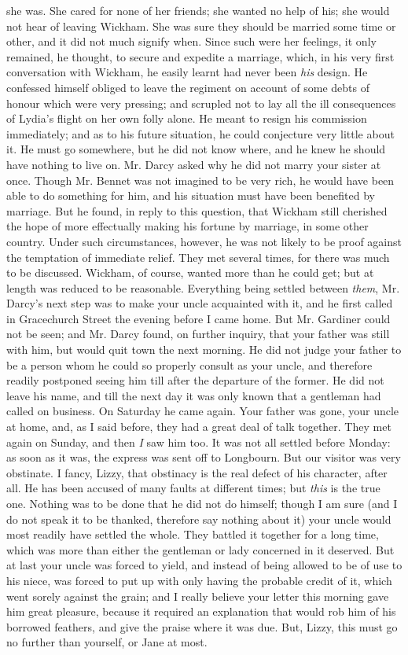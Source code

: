 \documentclass[12pt,openright]{book}
\begin{document}
she was. She cared for none of her friends; she wanted no help of his; she would not hear of leaving Wickham. She was sure they should be married some time or other, and it did not much signify when. Since such were her feelings, it only remained, he thought, to secure and expedite a marriage, which, in his very first conversation with Wickham, he easily learnt had never been \textit{his} design. He confessed himself obliged to leave the regiment on account of some debts of honour which were very pressing; and scrupled not to lay all the ill consequences of Lydia’s flight on her own folly alone. He meant to resign his commission immediately; and as to his future situation, he could conjecture very little about it. He must go somewhere, but he did not know where, and he knew he should have nothing to live on. Mr. Darcy asked why he did not marry your sister at once. Though Mr. Bennet was not imagined to be very rich, he would have been able to do something for him, and his situation must have been benefited by marriage. But he found, in reply to this question, that Wickham still cherished the hope of more effectually making his fortune by marriage, in some other country. Under such circumstances, however, he was not likely to be proof against the temptation of immediate relief. They met several times, for there was much to be discussed. Wickham, of course, wanted more than he could get; but at length was reduced to be reasonable. Everything being settled between \textit{them}, Mr. Darcy’s next step was to make your uncle acquainted with it, and he first called in Gracechurch Street the evening before I came home. But Mr. Gardiner could not be seen; and Mr. Darcy found, on further inquiry, that your father was still with him, but would quit town the next morning. He did not judge your father to be a person whom he could so properly consult as your uncle, and therefore readily postponed seeing him till after the departure of the former. He did not leave his name, and till the next day it was only known that a gentleman had called on business. On Saturday he came again. Your father was gone, your uncle at home, and, as I said before, they had a great deal of talk together. They met again on Sunday, and then \textit{I} saw him too. It was not all settled before Monday: as soon as it was, the express was sent off to Longbourn. But our visitor was very obstinate. I fancy, Lizzy, that obstinacy is the real defect of his character, after all. He has been accused of many faults at different times; but \textit{this} is the true one. Nothing was to be done that he did not do himself; though I am sure (and I do not speak it to be thanked, therefore say nothing about it) your uncle would most readily have settled the whole. They battled it together for a long time, which was more than either the gentleman or lady concerned in it deserved. But at last your uncle was forced to yield, and instead of being allowed to be of use to his niece, was forced to put up with only having the probable credit of it, which went sorely against the grain; and I really believe your letter this morning gave him great pleasure, because it required an explanation that would rob him of his borrowed feathers, and give the praise where it was due. But, Lizzy, this must go no further than yourself, or Jane at most. 
\end{document}
